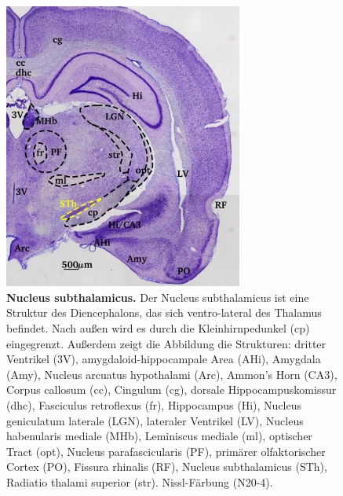 \begin{figure}[H]
    \centering
    \includegraphics[width=0.7\textwidth]{pictures/Basalganglia/Nucleus_subthalamus.png}
    \caption[Nucleus subthalamicus]{\textbf{Nucleus subthalamicus.} Der Nucleus subthalamicus ist eine Struktur des Diencephalons, das sich ventro-lateral des Thalamus befindet. Nach außen wird es durch die Kleinhirnpedunkel (cp) eingegrenzt. Außerdem zeigt die Abbildung die Strukturen: dritter Ventrikel (3V), amygdaloid-hippocampale Area (AHi), Amygdala (Amy), Nucleus arcuatus hypothalami (Arc), Ammon's Horn (CA3), Corpus callosum (cc), Cingulum (cg), dorsale Hippocampuskomissur (dhc), Fasciculus retroflexus (fr), Hippocampus (Hi), Nucleus geniculatum laterale (LGN), lateraler Ventrikel (LV), Nucleus habenularis mediale (MHb), Leminiscus mediale (ml), optischer Tract (opt), Nucleus parafascicularis (PF),  primärer  olfaktorischer  Cortex (PO), Fissura rhinalis (RF), Nucleus subthalamicus (STh), Radiatio thalami superior (str). Nissl-Färbung (N20-4).}
    \label{fig:Nucleus_subthalamus}
\end{figure}

